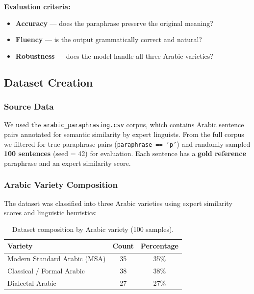 \documentclass[12pt, a4paper]{article}
\renewcommand{\arraystretch}{1.12}
\begin{document}
\textbf{Evaluation criteria:}
\begin{itemize}
    \item \textbf{Accuracy} --- does the paraphrase preserve the original meaning?
    \item \textbf{Fluency} --- is the output grammatically correct and natural?
    \item \textbf{Robustness} --- does the model handle all three Arabic varieties?
\end{itemize}

\subsection{Dataset Creation}

\subsubsection{Source Data}

We used the \texttt{arabic\_paraphrasing.csv} corpus, which contains Arabic
sentence pairs annotated for semantic similarity by expert linguists.
From the full corpus we filtered for true paraphrase pairs
(\texttt{paraphrase == `p'}) and randomly sampled \textbf{100 sentences}
(seed = 42) for evaluation.  Each sentence has a \textbf{gold reference}
paraphrase and an expert similarity score.

\subsubsection{Arabic Variety Composition}

The dataset was classified into three Arabic varieties using expert similarity
scores and linguistic heuristics:

\begin{table}[H]
\centering
\renewcommand{\arraystretch}{1.3}
\begin{tabular}{l c c}
\toprule
\textbf{Variety} & \textbf{Count} & \textbf{Percentage} \\
\midrule
Modern Standard Arabic (MSA)  & 35 & 35\% \\
Classical / Formal Arabic     & 38 & 38\% \\
Dialectal Arabic              & 27 & 27\% \\
\bottomrule
\end{tabular}
\caption{Dataset composition by Arabic variety (100 samples).}
\label{tab:p5_composition}
\end{table}
\end{document}
